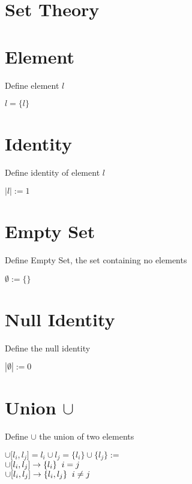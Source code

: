 \documentclass[11pt]{article}
\begin{document}
\newpage
\section*{Set Theory}

\section{Element}
Define element $l$
\begin{center}
$
l = \{l\}
$
\end{center}





\section{Identity}
Define identity of element $l$\\
\begin{center}
$
|l| := 1
$
\end{center}





\section{Empty Set}
Define Empty Set, the set containing no elements
\begin{center}
$
\emptyset := \{\}
$
\end{center}




\section{Null Identity}
Define the null identity
\begin{center}
$
|\emptyset| := 0
$
\end{center}




\section{Union $\cup$}
Define $\cup$ the union of two elements
\begin{center}
$\cup \lbrack l_i,l_j\rbrack = l_i \cup l_j = \{l_i\} \cup \{l_j\} :=$
\\ \vspace{2mm}
$\cup \lbrack l_i,l_j\rbrack \rightarrow \{l_i\} \hspace{2mm} i = j$
\\
$\cup \lbrack l_i,l_j\rbrack \rightarrow \{l_i,l_j\} \hspace{2mm} i \neq j$
\end{center}
\end{document}
